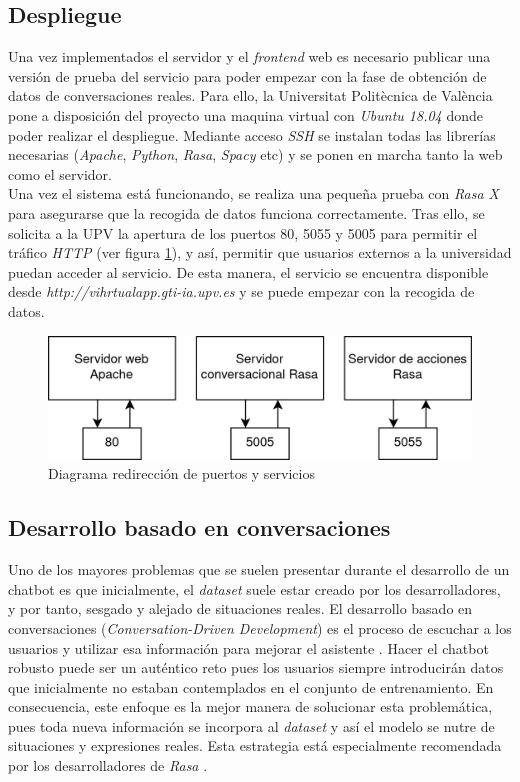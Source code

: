 \subsection{Despliegue}
Una vez implementados el servidor y el \textit{frontend} web es necesario publicar una versión de prueba del servicio para poder empezar con la fase de obtención de datos de conversaciones reales. Para ello, la Universitat Politècnica de València pone a disposición del proyecto una maquina virtual con \textit{Ubuntu 18.04} donde poder realizar el despliegue. Mediante acceso \textit{SSH} se instalan todas las librerías necesarias (\textit{Apache}, \textit{Python}, \textit{Rasa}, \textit{Spacy} etc) y se ponen en marcha tanto la web como el servidor.\\

Una vez el sistema está funcionando, se realiza una pequeña prueba con \textit{Rasa X} para asegurarse que la recogida de datos funciona correctamente. Tras ello, se solicita a la UPV la apertura de los puertos 80, 5055 y 5005 para permitir el tráfico \textit{HTTP} (ver figura \ref{fig:ports}), y así, permitir que usuarios externos a la universidad puedan acceder al servicio. De esta manera, el servicio se encuentra disponible desde \textit{http://vihrtualapp.gti-ia.upv.es} y se puede empezar con la recogida de datos.\\

\begin{figure}[htbp]
\centering
\includegraphics[scale=0.3]{../images/ports.png} 
\caption{Diagrama redirección de puertos y servicios} 
\label{fig:ports}
\end{figure}


\subsection{Desarrollo basado en conversaciones}
\label{cdd}
Uno de los mayores problemas que se suelen presentar durante el desarrollo de un chatbot es que inicialmente, el \textit{dataset} suele estar creado por los desarrolladores, y por tanto, sesgado y alejado de situaciones reales. El desarrollo basado en conversaciones (\textit{Conversation-Driven Development}) es el proceso de escuchar a los usuarios y utilizar esa información para mejorar el asistente \cite{conversationDriven}. Hacer el chatbot robusto puede ser un auténtico reto pues los usuarios siempre introducirán datos que inicialmente no estaban contemplados en el conjunto de entrenamiento. En consecuencia, este enfoque es la mejor manera de solucionar esta problemática, pues toda nueva información se incorpora al \textit{dataset} y así el modelo se nutre de situaciones y expresiones reales. Esta estrategia está especialmente recomendada por los desarrolladores de \textit{Rasa} \cite{bestPracticesNLU}.\\

